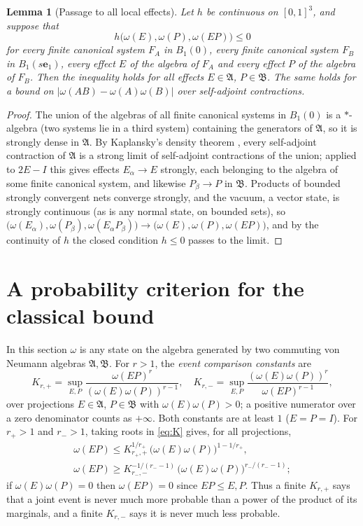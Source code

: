 \documentclass[aps,prl,reprint,longbibliography,raggedbottom]{revtex4-2}
\newtheorem{lemma}{Lemma}
\newcommand{\abs}[1]{\lvert #1\rvert}
\newcommand{\A}{\mathfrak A}
\newcommand{\B}{\mathfrak B}
\newcommand{\eone}{\mathbf e_1}
\begin{document}
\begin{lemma}[Passage to all local effects]\label{lem:exhaustion}
Let $h$ be continuous on $[0,1]^3$, and suppose that
\[
h\bigl(\omega(E),\omega(P),\omega(EP)\bigr)\le0
\]
for \emph{every} finite canonical system $F_A$ in $B_1(0)$, every
finite canonical system $F_B$ in $B_1(s\eone)$, every effect $E$ of
the algebra of $F_A$ and every effect $P$ of the algebra of $F_B$.
Then the inequality holds for all effects $E\in\A$, $P\in\B$. The
same holds for a bound on $\abs{\omega(AB)-\omega(A)\omega(B)}$ over
self-adjoint contractions.
\end{lemma}

\begin{proof}
The union of the algebras of all finite canonical systems in $B_1(0)$
is a $*$-algebra
(two systems lie in a third system) containing the generators of $\A$, so it
is strongly dense in $\A$. By Kaplansky's density theorem
\cite[Theorem~2.4.16]{BR87}, every self-adjoint contraction of $\A$ is
a strong limit of self-adjoint contractions of the union; applied to
$2E-I$ this gives effects $E_\alpha\to E$ strongly, each belonging to
the algebra of some finite canonical system, and likewise
$P_\beta\to P$ in $\B$. Products of bounded strongly convergent nets
converge strongly, and the vacuum, a vector state, is strongly
continuous (as is any normal state, on bounded sets), so
$\bigl(\omega(E_\alpha),\omega(P_\beta),\omega(E_\alpha P_\beta)\bigr)
\to\bigl(\omega(E),\omega(P),\omega(EP)\bigr)$, and by the
continuity of $h$ the closed condition $h\le0$ passes to the limit.
\end{proof}

\section{A probability criterion for the classical bound}
\label{sec:probability}

In this section $\omega$ is any state on the algebra generated by two
commuting von Neumann algebras $\A,\B$. For $r>1$, the \emph{event comparison
constants} are
\begin{equation}
K_{r,+}=\sup_{E,P}\frac{\omega(EP)^r}{(\omega(E)\omega(P))^{r-1}},
\quad
K_{r,-}=\sup_{E,P}\frac{(\omega(E)\omega(P))^r}{\omega(EP)^{r-1}},
\label{eq:K}
\end{equation}
over projections $E\in\A$, $P\in\B$ with $\omega(E)\omega(P)>0$; a
positive numerator over a zero denominator counts as $+\infty$. Both
constants are at least $1$ ($E=P=I$). For $r_+>1$ and $r_->1$, taking
roots in \eqref{eq:K} gives, for all projections,
\begin{equation}
\begin{gathered}
\omega(EP)\le K_{r_+,+}^{1/r_+}\,
\bigl(\omega(E)\omega(P)\bigr)^{1-1/r_+},\\
\omega(EP)\ge K_{r_-,-}^{-1/(r_--1)}\,
\bigl(\omega(E)\omega(P)\bigr)^{r_-/(r_--1)};
\end{gathered}
\label{eq:event-orders}
\end{equation}
if $\omega(E)\omega(P)=0$ then $\omega(EP)=0$ since $EP\le E,P$. Thus a
finite $K_{r,+}$ says that a joint event is never much more probable
than a power of the product of its marginals, and a finite $K_{r,-}$
says it is never much less probable.
\end{document}
